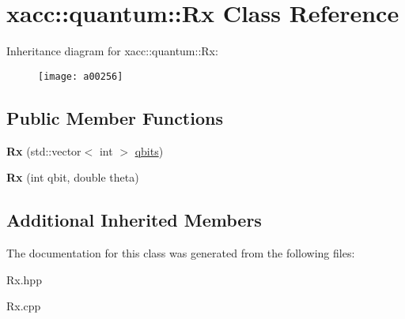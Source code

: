 \hypertarget{a00256}{}\section{xacc\+:\+:quantum\+:\+:Rx Class Reference}
\label{a00256}
Inheritance diagram for xacc\+:\+:quantum\+:\+:Rx\+:\begin{figure}[H]
\begin{center}
\leavevmode
\texttt{[image: a00256]}
\end{center}
\end{figure}
\subsection*{Public Member Functions}
\begin{DoxyCompactItemize}
\item 
{\bfseries Rx} (std\+::vector$<$ int $>$ \hyperlink{a00112_a2a56be6c2519ea65df4d06f4abae1393}{qbits})\hypertarget{a00256_a03babfe938a6cbf7f744fcd31a52d92d}{}\label{a00256_a03babfe938a6cbf7f744fcd31a52d92d}

\item 
{\bfseries Rx} (int qbit, double theta)\hypertarget{a00256_a01667b11d34d5621b98ebff9a07d9bbf}{}\label{a00256_a01667b11d34d5621b98ebff9a07d9bbf}

\end{DoxyCompactItemize}
\subsection*{Additional Inherited Members}


The documentation for this class was generated from the following files\+:\begin{DoxyCompactItemize}
\item 
Rx.\+hpp\item 
Rx.\+cpp\end{DoxyCompactItemize}
